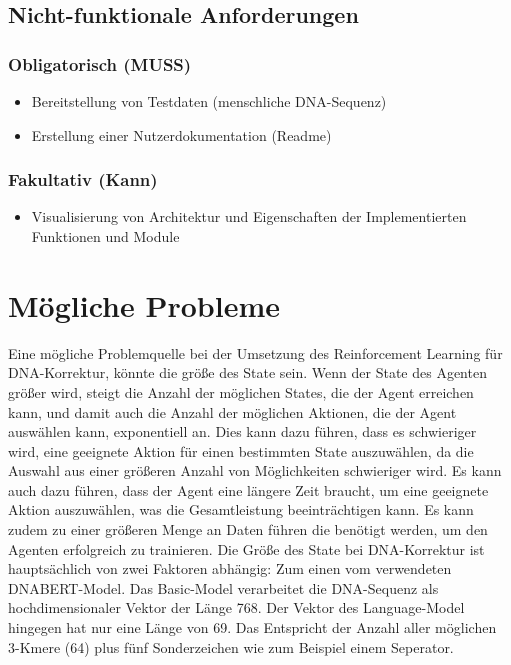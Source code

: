 \documentclass[oneside,bibliography=totocnumbered,BCOR=5mm]{scrbook}%
\theoremstyle{definition}
\theoremstyle{definition}
\theoremstyle{definition}
\theoremstyle{definition}
\theoremstyle{definition}
\theoremstyle{definition}
\begin{document}
\subsection{Nicht-funktionale Anforderungen}
\subsubsection{Obligatorisch (MUSS)}
\begin{itemize}
  \item Bereitstellung von Testdaten (menschliche DNA-Sequenz)
  \item Erstellung einer Nutzerdokumentation (Readme)
  \end{itemize}
\subsubsection{Fakultativ (Kann)}
\begin{itemize}
  \item Visualisierung von Architektur und Eigenschaften der Implementierten Funktionen und Module
  \end{itemize}

\section{Mögliche Probleme}
Eine mögliche Problemquelle bei der Umsetzung des Reinforcement Learning für DNA-Korrektur, 
könnte die größe des State sein. 
Wenn der State des Agenten größer wird, steigt die Anzahl der möglichen States, 
die der Agent erreichen kann, und damit auch die Anzahl der möglichen Aktionen, 
die der Agent auswählen kann, exponentiell an. 
Dies kann dazu führen, dass es schwieriger wird, eine geeignete Aktion für einen bestimmten State auszuwählen, 
da die Auswahl aus einer größeren Anzahl von Möglichkeiten schwieriger wird. 
Es kann auch dazu führen, dass der Agent eine längere Zeit braucht, um eine geeignete Aktion auszuwählen, 
was die Gesamtleistung beeinträchtigen kann.
Es kann zudem zu einer größeren Menge an Daten führen die benötigt werden, um den Agenten erfolgreich zu trainieren.
Die Größe des State bei DNA-Korrektur ist hauptsächlich von zwei Faktoren abhängig:
Zum einen vom verwendeten DNABERT-Model. 
Das Basic-Model verarbeitet die DNA-Sequenz als hochdimensionaler Vektor der Länge 768. 
Der Vektor des Language-Model hingegen hat nur eine Länge von 69. Das Entspricht der Anzahl aller möglichen
3-Kmere (64) plus fünf Sonderzeichen wie zum Beispiel einem Seperator.
\end{document}
